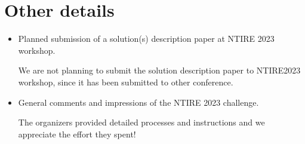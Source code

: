 \documentclass[10pt,twocolumn,letterpaper]{article}
\begin{document}
\section{Other details}
\begin{itemize}
\item Planned submission of a solution(s) description paper at NTIRE 2023 workshop.

We are not planning to submit the solution description paper to NTIRE2023 workshop, since it has been submitted to other conference.

\item General comments and impressions of the NTIRE 2023 challenge. 

The organizers provided detailed processes and instructions and we appreciate the effort they spent!

\end{itemize}
\end{document}
